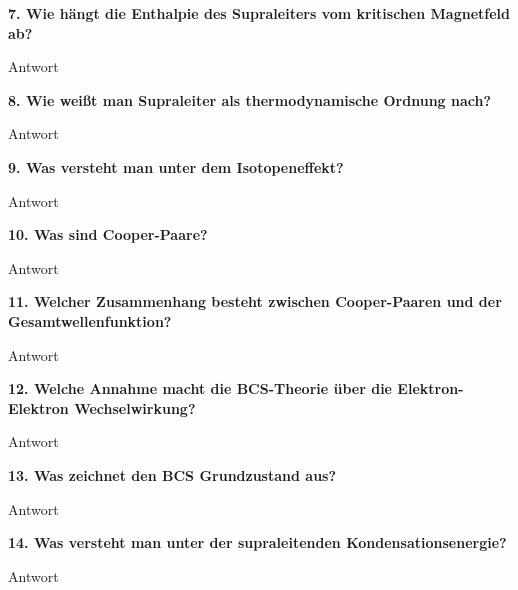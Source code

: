 \noindent\textbf{7. Wie hängt die Enthalpie des Supraleiters vom kritischen Magnetfeld ab?}\\
\begin{addmargin}[25pt]{0pt}
Antwort\\
\end{addmargin}

\noindent\textbf{8. Wie weißt man Supraleiter als thermodynamische Ordnung nach?}\\
\begin{addmargin}[25pt]{0pt}
Antwort\\
\end{addmargin}

\noindent\textbf{9. Was versteht man unter dem Isotopeneffekt?}\\
\begin{addmargin}[25pt]{0pt}
Antwort\\
\end{addmargin}

\noindent\textbf{10. Was sind Cooper-Paare?}\\
\begin{addmargin}[25pt]{0pt}
Antwort\\
\end{addmargin}

\noindent\textbf{11. Welcher Zusammenhang besteht zwischen Cooper-Paaren und der Gesamtwellenfunktion?}\\
\begin{addmargin}[25pt]{0pt}
Antwort\\
\end{addmargin}

\noindent\textbf{12. Welche Annahme macht die BCS-Theorie über die Elektron-Elektron Wechselwirkung?}\\
\begin{addmargin}[25pt]{0pt}
Antwort\\
\end{addmargin}

\noindent\textbf{13. Was zeichnet den BCS Grundzustand aus?}\\
\begin{addmargin}[25pt]{0pt}
Antwort\\
\end{addmargin}

\noindent\textbf{14. Was versteht man unter der supraleitenden Kondensationsenergie?}\\
\begin{addmargin}[25pt]{0pt}
Antwort\\
\end{addmargin}

